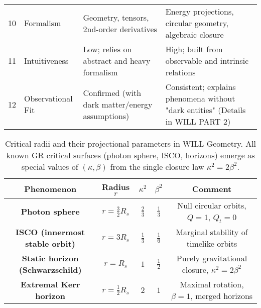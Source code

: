 \documentclass[12pt, a4paper]{article}
\begin{document}
\begin{tabularx}{\textwidth}{@{}clXX@{}}
10 & Formalism & 
Geometry, tensors, 2nd-order derivatives & 
Energy projections, circular geometry, algebraic closure \\
\addlinespace

11 & Intuitiveness & 
Low; relies on abstract and heavy formalism & 
High; built from observable and intrinsic relations \\
\addlinespace

12 & Observational Fit & 
Confirmed (with dark matter/energy assumptions) & 
Consistent; explains phenomena without "dark entities"  (Details in WILL PART 2) \\
\bottomrule
\end{tabularx}



\begin{table}[h]
\centering
\renewcommand{\arraystretch}{1.2}
\begin{tabular}{|c|c|c|c|c|}
\hline
\textbf{Phenomenon} & \textbf{Radius $r$} & \(\kappa^2\) & \(\beta^2\) & \textbf{Comment} \\
\hline
\textbf{Photon sphere} & $r=\tfrac{3}{2}R_s$ & $\tfrac{2}{3}$ & $\tfrac{1}{3}$ & Null circular orbits, $Q=1$, $Q_t=0$ \\
\hline
\textbf{ISCO (innermost stable orbit)} & $r=3R_s$ & $\tfrac{1}{3}$ & $\tfrac{1}{6}$ & Marginal stability of timelike orbits \\
\hline
\textbf{Static horizon (Schwarzschild)} & $r=R_s$ & $1$ & $\tfrac{1}{2}$ & Purely gravitational closure, $\kappa^2=2\beta^2$ \\
\hline
\textbf{Extremal Kerr horizon} & $r=\tfrac{1}{2}R_s$ & $2$ & $1$ & Maximal rotation, $\beta=1$, merged horizons \\\hline
\end{tabular}
\caption{Critical radii and their projectional parameters in WILL Geometry. 
All known GR critical surfaces (photon sphere, ISCO, horizons) emerge as special values of $(\kappa,\beta)$ from the single closure law $\kappa^2=2\beta^2$.}
\end{table}
\end{document}
